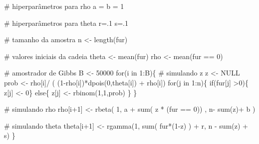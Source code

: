 \documentclass[
  letterpaper,
  DIV=11,
  numbers=noendperiod]{scrreprt}
\newenvironment{Shaded}{\begin{snugshade}}{\end{snugshade}}
\newcommand{\CommentTok}[1]{\textcolor[rgb]{0.37,0.37,0.37}{#1}}
\newcommand{\ConstantTok}[1]{\textcolor[rgb]{0.56,0.35,0.01}{#1}}
\newcommand{\ControlFlowTok}[1]{\textcolor[rgb]{0.00,0.23,0.31}{#1}}
\newcommand{\DecValTok}[1]{\textcolor[rgb]{0.68,0.00,0.00}{#1}}
\newcommand{\FunctionTok}[1]{\textcolor[rgb]{0.28,0.35,0.67}{#1}}
\newcommand{\NormalTok}[1]{\textcolor[rgb]{0.00,0.23,0.31}{#1}}
\newcommand{\OtherTok}[1]{\textcolor[rgb]{0.00,0.23,0.31}{#1}}
\newcommand{\SpecialCharTok}[1]{\textcolor[rgb]{0.37,0.37,0.37}{#1}}
\theoremstyle{definition}
\theoremstyle{definition}
\theoremstyle{remark}
\begin{document}
\begin{Shaded}
\begin{Highlighting}[]
\CommentTok{\# hiperparâmetros para rho}
\NormalTok{a }\OtherTok{=}\NormalTok{ b }\OtherTok{=} \DecValTok{1}

\CommentTok{\# hiperparâmetros para theta}
\NormalTok{r}\OtherTok{=}\NormalTok{.}\DecValTok{1}
\NormalTok{s}\OtherTok{=}\NormalTok{.}\DecValTok{1}

\CommentTok{\# tamanho da amostra}
\NormalTok{n }\OtherTok{\textless{}{-}} \FunctionTok{length}\NormalTok{(fur) }

\CommentTok{\# valores iniciais da cadeia}
\NormalTok{theta }\OtherTok{\textless{}{-}} \FunctionTok{mean}\NormalTok{(fur)}
\NormalTok{rho }\OtherTok{\textless{}{-}} \FunctionTok{mean}\NormalTok{(fur }\SpecialCharTok{==} \DecValTok{0}\NormalTok{)}

\CommentTok{\# amostrador de Gibbs}
\NormalTok{B }\OtherTok{\textless{}{-}} \DecValTok{50000}
\ControlFlowTok{for}\NormalTok{(i }\ControlFlowTok{in} \DecValTok{1}\SpecialCharTok{:}\NormalTok{B)\{}
  \CommentTok{\# simulando z}
\NormalTok{  z }\OtherTok{\textless{}{-}} \ConstantTok{NULL}
\NormalTok{  prob }\OtherTok{\textless{}{-}}\NormalTok{ rho[i]}\SpecialCharTok{/}\NormalTok{ ( (}\DecValTok{1}\SpecialCharTok{{-}}\NormalTok{rho[i])}\SpecialCharTok{*}\FunctionTok{dpois}\NormalTok{(}\DecValTok{0}\NormalTok{,theta[i]) }\SpecialCharTok{+}\NormalTok{ rho[i])}
  \ControlFlowTok{for}\NormalTok{(j }\ControlFlowTok{in} \DecValTok{1}\SpecialCharTok{:}\NormalTok{n)\{}
    \ControlFlowTok{if}\NormalTok{(fur[j] }\SpecialCharTok{\textgreater{}}\DecValTok{0}\NormalTok{)\{ z[j] }\OtherTok{\textless{}{-}} \DecValTok{0}\NormalTok{\} }\ControlFlowTok{else}\NormalTok{\{}
\NormalTok{      z[j] }\OtherTok{\textless{}{-}} \FunctionTok{rbinom}\NormalTok{(}\DecValTok{1}\NormalTok{,}\DecValTok{1}\NormalTok{,prob)}
\NormalTok{    \}}
\NormalTok{  \}}

  \CommentTok{\# simulando rho}
\NormalTok{  rho[i}\SpecialCharTok{+}\DecValTok{1}\NormalTok{] }\OtherTok{\textless{}{-}} \FunctionTok{rbeta}\NormalTok{( }\DecValTok{1}\NormalTok{, a }\SpecialCharTok{+} \FunctionTok{sum}\NormalTok{( z }\SpecialCharTok{*}\NormalTok{ (fur }\SpecialCharTok{==} \DecValTok{0}\NormalTok{)) , n}\SpecialCharTok{{-}} \FunctionTok{sum}\NormalTok{(z)}\SpecialCharTok{+}\NormalTok{ b )}
  
  \CommentTok{\# simulando theta}
\NormalTok{  theta[i}\SpecialCharTok{+}\DecValTok{1}\NormalTok{] }\OtherTok{\textless{}{-}} \FunctionTok{rgamma}\NormalTok{(}\DecValTok{1}\NormalTok{, }\FunctionTok{sum}\NormalTok{( fur}\SpecialCharTok{*}\NormalTok{(}\DecValTok{1}\SpecialCharTok{{-}}\NormalTok{z) ) }\SpecialCharTok{+}\NormalTok{ r,  n }\SpecialCharTok{{-}} \FunctionTok{sum}\NormalTok{(z) }\SpecialCharTok{+}\NormalTok{ s)}
\NormalTok{\}}
\end{Highlighting}
\end{Shaded}
\end{document}

